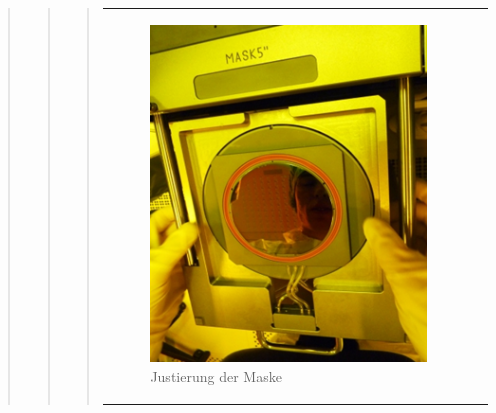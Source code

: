 \begin{quote}
\begin{quote}
\begin{quote}
 			\vspace{2em}
    
    		\begin{center}
                \begin{tabular}{ll}

                \hspace{-14em}
                    \begin{minipage}{0.6\textwidth}
                        \begin{figure}[H]
                        \hspace{2em}
                            \includegraphics[scale=1.0, trim = 0cm 0cm 0cm
                            0cm, clip]{./HerstellungBilder/Maskenjustierer.png}
                            \caption{Justierung der Maske}
                           \label{fig:just}
                        \end{figure}

                    \end{minipage}
                    \begin{minipage}{0.6\textwidth} 


\end{minipage}
\end{tabular}
\end{center}
\end{quote}
\end{quote}
\end{quote}
